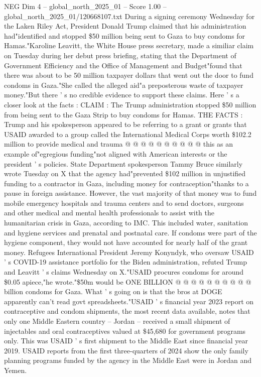 \begin{textsample}{NEG Dim 4 – global\_north\_2025\_01 – Score 1.00 – global\_north\_2025\_01/120668107.txt}  \label{ex:f4_neg_415}
During a signing ceremony Wednesday for the Laken Riley Act, President Donald Trump claimed that his administration had"identified and stopped \$50 million being sent to Gaza to buy condoms for Hamas."Karoline Leavitt, the White House press secretary, made a similiar claim on Tuesday during her debut press briefing, stating that the Department of Government Efficiency and the Office of Management and Budget"found that there was about to be 50 million taxpayer dollars that went out the door to fund condoms in Gaza."She called the alleged aid"a preposterous waste of taxpayer money."But there ' s no credible evidence to support these claims.
Here ' s a closer look at the facts : CLAIM : The Trump administration stopped \$50 million from being sent to the Gaza Strip to buy condoms for Hamas.
THE FACTS : Trump and his spokesperson appeared to be referring to a grant or grants that USAID awarded to a group called the International Medical Corps worth \$102.2 million to provide medical and trauma @ @ @ @ @ @ @ @ @ @ this as an example of"egregious funding"not aligned with American interests or the president ' s policies.
State Department spokesperson Tammy Bruce similarly wrote Tuesday on X that the agency had"prevented \$102 million in unjustified funding to a contractor in Gaza, including money for contraception"thanks to a pause in foreign assistance.
However, the vast majority of that money was to fund mobile emergency hospitals and trauma centers and to send doctors, surgeons and other medical and mental health professionals to assist with the humanitarian crisis in Gaza, according to IMC.
This included water, sanitation and hygiene services and prenatal and postnatal care.
If condoms were part of the hygiene component, they would not have accounted for nearly half of the grant money.
Refugees International President Jeremy Konyndyk, who oversaw USAID ' s COVID-19 assistance portfolio for the Biden administration, refuted Trump and Leavitt ' s claims Wednesday on X."USAID procures condoms for around \$0.05 apiece,"he wrote."\$50m would be ONE BILLION @ @ @ @ @ @ @ @ @ @ billion condoms for Gaza.
What ' s going on is that the bros at DOGE apparently can't read govt spreadsheets."USAID ' s financial year 2023 report on contraceptive and condom shipments, the most recent data available, notes that only one Middle Eastern country -- Jordan -- received a small shipment of injectables and oral contraceptives valued at \$45,680 for government programs only.
This was USAID ' s first shipment to the Middle East since financial year 2019.
USAID reports from the first three-quarters of 2024 show the only family planning programs funded by the agency in the Middle East were in Jordan and Yemen.

\end{textsample}
